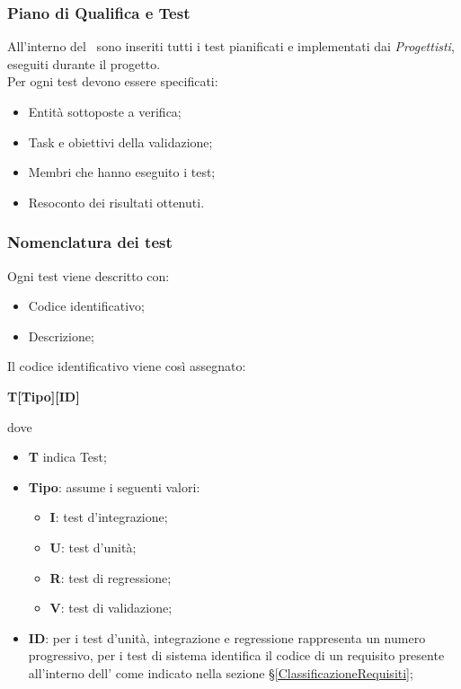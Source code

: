 \subsubsection{Piano di Qualifica e Test}
All'interno del \PdQv{}\ sono inseriti tutti i test pianificati e implementati dai \textit{Progettisti}, eseguiti durante il progetto. \\
Per ogni test devono essere specificati:
\begin{itemize}
	\item Entità sottoposte a verifica;
	\item Task e obiettivi della validazione;
	\item Membri che hanno eseguito i test;
	\item Resoconto dei risultati ottenuti.
\end{itemize}

\subsubsection{Nomenclatura dei test}
Ogni test viene descritto con:
\begin{itemize}
	\item Codice identificativo;
	\item Descrizione;
\end{itemize}
Il codice identificativo viene così assegnato:
\begin{center}
	\textbf{T[Tipo][ID]}
\end{center}
dove
\begin{itemize}
	\item \textbf{T} indica Test;
	\item\textbf{Tipo}: assume i seguenti valori:
	\begin{itemize}
		\item \textbf{I}: test d'integrazione;
		\item \textbf{U}: test d'unità;
		\item \textbf{R}: test di regressione;
		\item \textbf{V}: test di validazione;
	\end{itemize}
	\item \textbf{ID}: per i test d'unità, integrazione e regressione rappresenta un numero progressivo, per i test di sistema identifica il codice di un requisito presente all'interno dell'\AdRv{} come indicato nella sezione \S\ref{ClassificazioneRequisiti};
\end{itemize}
	